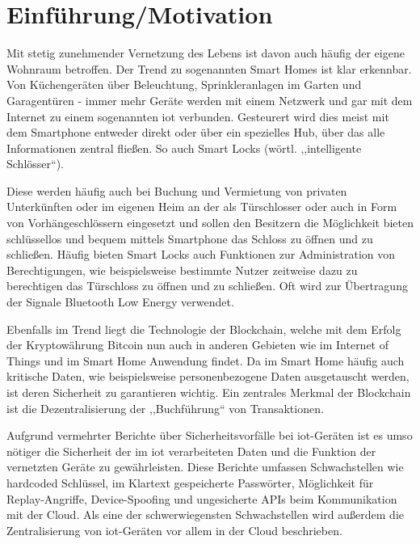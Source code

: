 \section*{Einführung/Motivation}
    
    Mit stetig zunehmender Vernetzung des Lebens ist davon auch häufig der eigene Wohnraum betroffen. 
    Der Trend zu sogenannten Smart Homes ist klar erkennbar. 
    Von Küchengeräten über Beleuchtung, Sprinkleranlagen im Garten und Ga\-ra\-gen\-tü\-ren - immer mehr Geräte werden mit einem Netzwerk und gar mit dem Internet zu einem sogenannten \gls{iot} verbunden. 
    Gesteurert wird dies meist mit dem Smartphone entweder direkt oder über ein spezielles Hub, über das alle Informationen zentral fließen.
    So auch Smart Locks (wörtl. ,,intelligente Schlösser``).

    Diese werden häufig auch bei Buchung und Vermietung von privaten Unterkünften oder im eigenen Heim an der als Türschlosser oder auch in Form von Vorhängeschlössern eingesetzt und sollen den Besitzern die Möglichkeit bieten schlüssellos und bequem mittels Smartphone das Schloss zu öffnen und zu schließen.
    Häufig bieten Smart Locks auch Funktionen zur Administration von Berechtigungen, wie beispielsweise bestimmte Nutzer zeitweise dazu zu berechtigen das Türschloss zu öffnen und zu schließen.
    Oft wird zur Übertragung der Signale Bluetooth Low Energy verwendet.
    
    Ebenfalls im Trend liegt die Technologie der Blockchain, welche mit dem Erfolg der Kryptowährung Bitcoin nun auch in anderen Gebieten wie im Internet of Things und im Smart Home Anwendung findet.
    Da im Smart Home häufig auch kritische Daten, wie beispielsweise personenbezogene Daten ausgetauscht werden, ist deren Sicherheit zu garantieren wichtig.
    Ein zentrales Merkmal der Blockchain ist die Dezentralisierung der ,,Buchführung`` von Transaktionen.\newline
    
    Aufgrund vermehrter Berichte über Sicherheitsvorfälle bei \gls{iot}-Geräten ist es umso nötiger die Sicherheit der im \gls{iot} verarbeiteten Daten und die Funktion der vernetzten Geräte zu gewährleisten.
    Diese Berichte umfassen Schwachstellen wie hardcoded Schlüssel, im Klartext gespeicherte Passwörter, Möglichkeit für Replay-Angriffe, Device-Spoofing\cite{Rose2016} und ungesicherte APIs beim Kommunikation mit der Cloud\cite{Stykas2018}. 
    Als eine der schwerwiegensten Schwachstellen wird außerdem die Zentralisierung von \gls{iot}-Geräten vor allem in der Cloud beschrieben\cite{Kshetri2017}.


